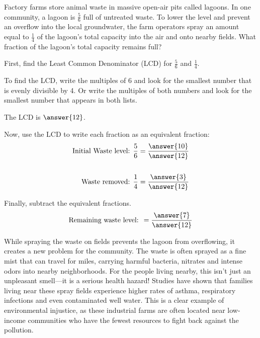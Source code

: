 \documentclass{ximera}
\begin{document}
\begin{problem}
Factory farms store animal waste in massive open-air pits called lagoons. In one community, a lagoon is $\textstyle \frac{5}{6}$ full of untreated waste. To lower the level and prevent an overflow into the local groundwater, the farm operators spray an amount equal to $\textstyle \frac{1}{4}$ of the lagoon’s total capacity into the air and onto nearby fields.  What fraction of the lagoon's total capacity remains full?

First, find the Least Common Denominator (LCD) for $\frac{5}{6}$ and $\frac{1}{4}$.
\begin{hint}
To find the LCD, write the multiples of 6 and look for the smallest number that is evenly divisible by 4. Or write the multiples of both numbers and look for the smallest number that appears in both lists.
\end{hint}

The LCD is $\answer{12}$.

Now, use the LCD to write each fraction as an equivalent fraction:
\begin{align*}
\text{Initial Waste level: } \frac{5}{6} &= \frac{\answer{10}}{\answer{12}} \\
& \\
\text{Waste removed: } \frac{1}{4} &= \frac{\answer{3}}{\answer{12}}
\end{align*}

Finally, subtract the equivalent fractions.
\[
\textrm{Remaining waste level: }  = \frac{ \answer{7} }{ \answer{12} }
\]

\begin{feedback}
While spraying the waste on fields prevents the lagoon from overflowing, it creates a new problem for the community. The waste is often sprayed as a fine mist that can travel for miles, carrying harmful bacteria, nitrates and intense odors into nearby neighborhoods.
For the people living nearby, this isn't just an unpleasant smell---it is a serious health hazard! Studies have shown that families living near these spray fields experience higher rates of asthma, respiratory infections and even contaminated well water. This is a clear example of environmental injustice, as these industrial farms are often located near low-income communities who have the fewest resources to fight back against the pollution.
\end{feedback}
\end{problem}
\end{document}
